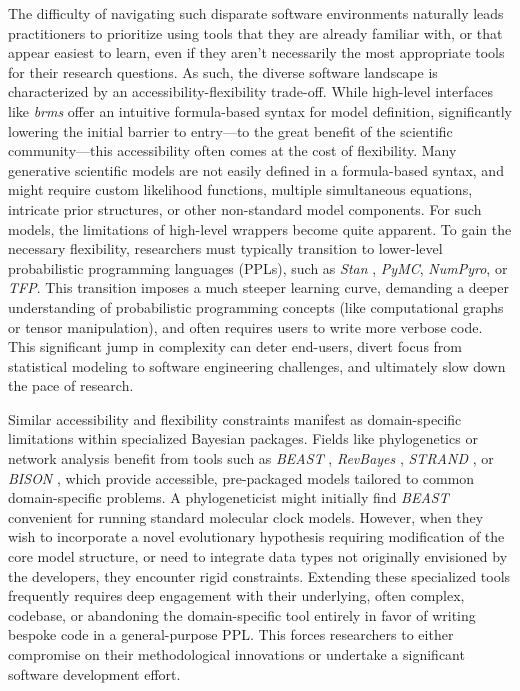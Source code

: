 \documentclass[num-refs]{wiley-article}
\begin{document}
The difficulty of navigating such disparate software environments naturally leads practitioners to prioritize using tools that they are already familiar with, or that appear easiest to learn, even if they aren't necessarily the most appropriate tools for their research questions. As such, the diverse software landscape is characterized by an accessibility-flexibility trade-off. While high-level interfaces like \textit{brms} offer an intuitive formula-based syntax for model definition, significantly lowering the initial barrier to entry---to the great benefit of the scientific community---this accessibility often comes at the cost of flexibility. Many generative scientific models are not easily defined in a formula-based syntax, and might require custom likelihood functions, multiple simultaneous equations, intricate prior structures, or other non-standard model components. For such models, the limitations of high-level wrappers become quite apparent. To gain the necessary flexibility, researchers must typically transition to lower-level probabilistic programming languages (PPLs), such as \textit{Stan} \citep{Stan}, \textit{PyMC}, \textit{NumPyro}, or \textit{TFP}. This transition imposes a much steeper learning curve, demanding a deeper understanding of probabilistic programming concepts (like computational graphs or tensor manipulation), and often requires users to write more verbose code. This significant jump in complexity can deter end-users, divert focus from statistical modeling to software engineering challenges, and ultimately slow down the pace of research.

Similar accessibility and flexibility constraints manifest as domain-specific limitations within specialized Bayesian packages. Fields like phylogenetics or network analysis benefit from tools such as \textit{BEAST} \citep{BEAST}, \textit{RevBayes} \citep{RevBayes}, \textit{STRAND} \citep{STRAND1}, or \textit{BISON} \citep{BISON}, which provide accessible, pre-packaged models tailored to common domain-specific problems. A phylogeneticist might initially find \textit{BEAST} convenient for running standard molecular clock models. However, when they wish to incorporate a novel evolutionary hypothesis requiring modification of the core model structure, or need to integrate data types not originally envisioned by the developers, they encounter rigid constraints. Extending these specialized tools frequently requires deep engagement with their underlying, often complex, codebase, or abandoning the domain-specific tool entirely in favor of writing bespoke code in a general-purpose PPL. This forces researchers to either compromise on their methodological innovations or undertake a significant software development effort. 
\end{document}
